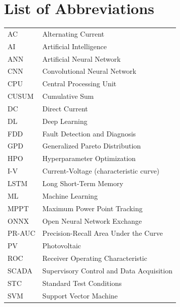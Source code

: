 \documentclass[12pt,a4paper]{report}
\begin{document}
\chapter*{List of Abbreviations}
\begin{longtable}{ll}
    AC       & Alternating Current \\
    AI       & Artificial Intelligence \\
    ANN      & Artificial Neural Network \\
    CNN      & Convolutional Neural Network \\
    CPU      & Central Processing Unit \\
    CUSUM    & Cumulative Sum \\
    DC       & Direct Current \\
    DL       & Deep Learning \\
    FDD      & Fault Detection and Diagnosis \\
    GPD      & Generalized Pareto Distribution \\
    HPO      & Hyperparameter Optimization \\
    I-V      & Current-Voltage (characteristic curve) \\
    LSTM     & Long Short-Term Memory \\
    ML       & Machine Learning \\
    MPPT     & Maximum Power Point Tracking \\
    ONNX     & Open Neural Network Exchange \\
    PR-AUC   & Precision-Recall Area Under the Curve \\
    PV       & Photovoltaic \\
    ROC      & Receiver Operating Characteristic \\
    SCADA    & Supervisory Control and Data Acquisition \\
    STC      & Standard Test Conditions \\
    SVM      & Support Vector Machine \\
\end{longtable}

\setcounter{table}{0}

\clearpage




\end{document}
